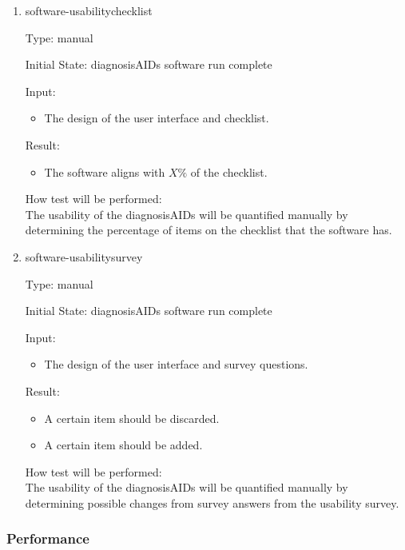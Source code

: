 \documentclass[12pt, titlepage]{article}
\begin{document}
\begin{enumerate}
\begin{enumerate}

\item{software-usabilitychecklist\\}

Type: manual
					
Initial State: diagnosisAIDs software run complete
					
Input:
\begin{itemize} %
\item The design of the user interface and checklist.
\end{itemize}

Result: 
\begin{itemize}
\item The software aligns with $X\%$ of the checklist.
\end{itemize}
				
					
How test will be performed: \\
The usability of the diagnosisAIDs will be quantified manually by determining 
the percentage of items on the checklist that the software has.\\

\item{software-usabilitysurvey\\}

Type: manual
					
Initial State: diagnosisAIDs software run complete
					
Input:
\begin{itemize} %
\item The design of the user interface and survey questions.
\end{itemize}

Result: 
\begin{itemize}
\item A certain item should be discarded.
\item A certain item should be added.
\end{itemize}
				
					
How test will be performed: \\
The usability of the diagnosisAIDs will be quantified manually by determining 
possible changes from survey answers from the usability survey.\\

\end{enumerate}

\subsubsection{Performance}


\end{enumerate}
\end{document}
